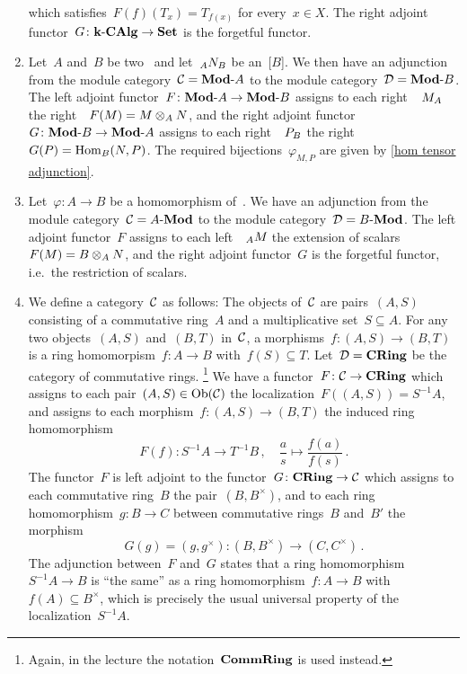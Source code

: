\begin{example}
\begin{enumerate}
\[      \]
      which satisfies~$F(f)(T_x) = T_{f(x)}$ for every~$x \in X$.
      The right adjoint functor~$G \colon \text{$\mathbf{k}$-$\mathbf{CAlg}$} \to \mathbf{Set}$ is the forgetful functor.
    \item
      Let~$A$ and~$B$ be two~{\kalgs} and let~$\indmodule[A]{N}[B]$ be an~{[$B$]}.
      We then have an adjunction from the module category~$\mathcal{C} = \text{$\mathbf{Mod}$-$A$}$ to the module category~$\mathcal{D} = \text{$\mathbf{Mod}$-$B$}$.
      The left adjoint functor~$F \colon \text{$\mathbf{Mod}$-$A$} \to \text{$\mathbf{Mod}$-$B$}$ assigns to each right~{}~$\indmodule{M}[A]$ the right~{}~$F(M) = M \otimes_A N$, and the right adjoint functor~$G \colon \text{$\mathbf{Mod}$-$B$} \to \text{$\mathbf{Mod}$-$A$}$ assigns to each right~{}~$\indmodule{P}[B]$ the right~{}~$G(P) = \operatorname{Hom}_B(N,P)$.
      The required bijections~$\varphi_{M,P}$ are given by \cref{hom tensor adjunction}.
    \item
      Let~$\varphi \colon A \to B$ be a homomorphism of~{\kalgs}.
      We have an adjunction from the module category~$\mathcal{C} = \text{$A$-$\mathbf{Mod}$}$ to the module category~$\mathcal{D} = \text{$B$-$\mathbf{Mod}$}$.
      The left adjoint functor~$F$ assigns to each left~{}~$\indmodule[A]{M}$ the extension of scalars~$F(M) = B \otimes_A N$, and the right adjoint functor~$G$ is the forgetful functor, i.e.\ the restriction of scalars.
    \item
      We define a category~$\mathcal{C}$ as follows:
      The objects of~$\mathcal{C}$ are pairs~$(A,S)$ consisting of a commutative ring~$A$ and a multiplicative set~$S \subseteq A$.
      For any two objects~$(A,S)$ and~$(B,T)$ in~$\mathcal{C}$, a morphisms~$f \colon (A,S) \to (B,T)$ is a ring homomorpism~$f \colon A \to B$ with~$f(S) \subseteq T$.
      Let~$\mathcal{D} = \mathbf{CRing}$ be the category of commutative rings.%
      \footnote{Again, in the lecture the notation~$\mathbf{CommRing}$ is used instead.}
      We have a functor~$F \colon \mathcal{C} \to \mathbf{CRing}$ which assigns to each pair~$(A,S) \in \operatorname{Ob}(\mathcal{C})$ the localization~$F((A,S)) = S^{-1} A$, and assigns to each morphism~$f \colon (A,S) \to (B,T)$ the induced ring homomorphism
      \[
                F(f)
        \colon  S^{-1} A
        \to     T^{-1} B \,,
        \quad   \frac{a}{s}
        \mapsto \frac{f(a)}{f(s)} \,.
      \]
      The functor~$F$ is left adjoint to the functor~$G \colon \mathbf{CRing} \to \mathcal{C}$ which assigns to each commutative ring~$B$ the pair~$(B,B^\times)$, and to each ring homomorphism~$g \colon B \to C$ between commutative rings~$B$ and~$B'$ the morphism
      \[
                G(g)
        =       (g, g^\times)
        \colon  (B, B^\times)
        \to     (C, C^\times) \,.
      \]
      The adjunction between~$F$ and~$G$ states that a ring homomorphism~$S^{-1} A \to B$ is \enquote{the same} as a ring homomorphism~$f \colon A \to B$ with~$f(A) \subseteq B^\times$, which is precisely the usual universal property of the localization~$S^{-1} A$.
  \end{enumerate}
\end{example}


